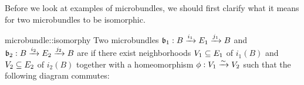 \begin{myparagraph}
    Before we look at examples of microbundles, we should first clarify
    what it means for two microbundles to be isomorphic.
\end{myparagraph}

\begin{mydefinition}[isomorphy]{microbundle::isomorphy}
    Two microbundles $\bundledef{\bb_1}{B}{E_1}{i_1}{j_1}$ and $\bundledef{\bb_2}{B}{E_2}{i_2}{j_2}$
    are  if there exist neighborhoods $V_1 \sub E_1$ of $i_1(B)$ and $V_2 \sub E_2$ of $i_2(B)$
    together with a homeomorphism $\phi: V_1 \isomto V_2$ such that the following diagram commutes: 
    \begin{center}
    \end{center}
\end{mydefinition}